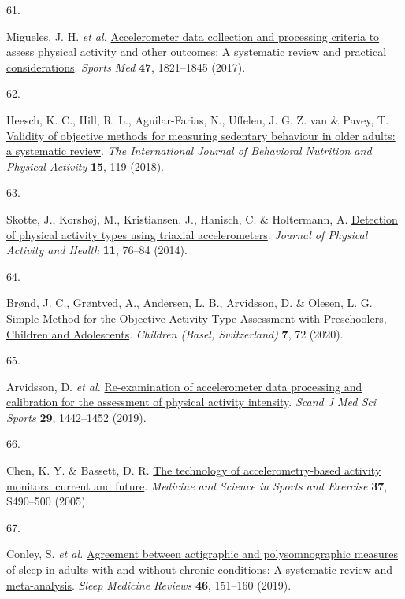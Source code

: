 \documentclass[
  10pt,
]{scrbook}
\newlength{\cslhangindent}
\newlength{\csllabelwidth}
\newlength{\cslentryspacingunit} %
\newenvironment{CSLReferences}[2] %
 {%
  \setlength{\parindent}{0pt}
  \ifodd #1
  \let\oldpar\par
  \def\par{\hangindent=\cslhangindent\oldpar}
  \fi
  \setlength{\parskip}{#2\cslentryspacingunit}
 }%
 {}
\newcommand{\CSLLeftMargin}[1]{\parbox[t]{\csllabelwidth}{#1}}
\newcommand{\CSLRightInline}[1]{\parbox[t]{\linewidth - \csllabelwidth}{#1}\break}
\let\originaltextbf\textbf
\renewcommand{\textbf}[1]{\textcolor{color1}{\textsf{\originaltextbf{#1}}}}
\begin{document}
\begin{CSLReferences}{0}{0}
\leavevmode{}%
\CSLLeftMargin{61. }%
\CSLRightInline{Migueles, J. H. \emph{et al.}
\href{https://doi.org/10.1007/s40279-017-0716-0}{Accelerometer data
collection and processing criteria to assess physical activity and other
outcomes: A systematic review and practical considerations}.
\emph{Sports Med} \textbf{47}, 1821--1845 (2017).}

\leavevmode{}%
\CSLLeftMargin{62. }%
\CSLRightInline{Heesch, K. C., Hill, R. L., Aguilar-Farias, N., Uffelen,
J. G. Z. van \& Pavey, T.
\href{https://doi.org/10.1186/s12966-018-0749-2}{Validity of objective
methods for measuring sedentary behaviour in older adults: a systematic
review}. \emph{The International Journal of Behavioral Nutrition and
Physical Activity} \textbf{15}, 119 (2018).}

\leavevmode{}%
\CSLLeftMargin{63. }%
\CSLRightInline{Skotte, J., Korshøj, M., Kristiansen, J., Hanisch, C. \&
Holtermann, A. \href{https://doi.org/10.1123/jpah.2011-0347}{Detection
of physical activity types using triaxial accelerometers}. \emph{Journal
of Physical Activity and Health} \textbf{11}, 76--84 (2014).}

\leavevmode{}%
\CSLLeftMargin{64. }%
\CSLRightInline{Brønd, J. C., Grøntved, A., Andersen, L. B., Arvidsson,
D. \& Olesen, L. G.
\href{https://doi.org/10.3390/children7070072}{Simple Method for the
Objective Activity Type Assessment with Preschoolers, Children and
Adolescents}. \emph{Children (Basel, Switzerland)} \textbf{7}, 72
(2020).}

\leavevmode{}%
\CSLLeftMargin{65. }%
\CSLRightInline{Arvidsson, D. \emph{et al.}
\href{https://doi.org/10.1111/sms.13470}{Re-examination of accelerometer
data processing and calibration for the assessment of physical activity
intensity}. \emph{Scand J Med Sci Sports} \textbf{29}, 1442--1452
(2019).}

\leavevmode{}%
\CSLLeftMargin{66. }%
\CSLRightInline{Chen, K. Y. \& Bassett, D. R.
\href{https://doi.org/10.1249/01.mss.0000185571.49104.82}{The technology
of accelerometry-based activity monitors: current and future}.
\emph{Medicine and Science in Sports and Exercise} \textbf{37},
S490--500 (2005).}

\leavevmode{}%
\CSLLeftMargin{67. }%
\CSLRightInline{Conley, S. \emph{et al.}
\href{https://doi.org/10.1016/j.smrv.2019.05.001}{Agreement between
actigraphic and polysomnographic measures of sleep in adults with and
without chronic conditions: A systematic review and meta-analysis}.
\emph{Sleep Medicine Reviews} \textbf{46}, 151--160 (2019).}


\end{CSLReferences}
\end{document}
